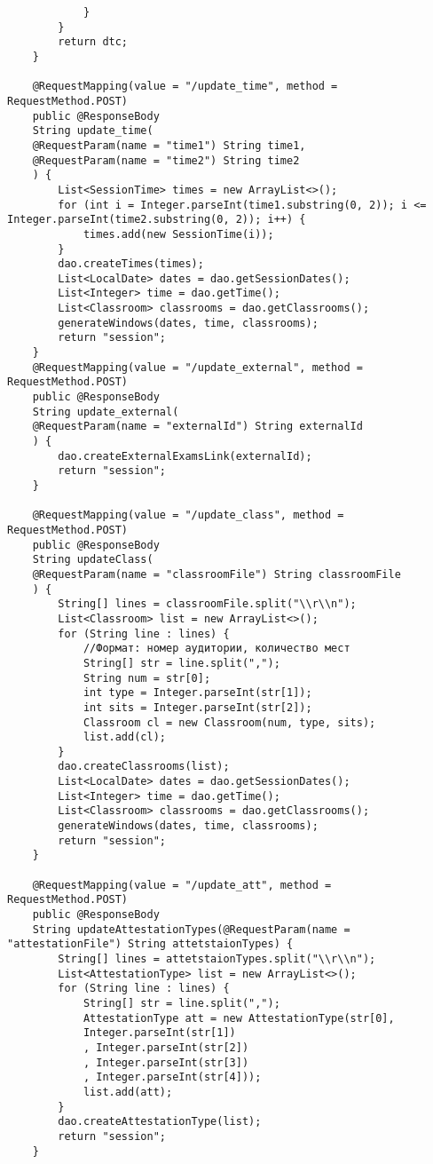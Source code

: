 \begin{lstlisting}
			}
		}
		return dtc;
	}
	
	@RequestMapping(value = "/update_time", method = RequestMethod.POST)
	public @ResponseBody
	String update_time(
	@RequestParam(name = "time1") String time1,
	@RequestParam(name = "time2") String time2
	) {
		List<SessionTime> times = new ArrayList<>();
		for (int i = Integer.parseInt(time1.substring(0, 2)); i <= Integer.parseInt(time2.substring(0, 2)); i++) {
			times.add(new SessionTime(i));
		}
		dao.createTimes(times);
		List<LocalDate> dates = dao.getSessionDates();
		List<Integer> time = dao.getTime();
		List<Classroom> classrooms = dao.getClassrooms();
		generateWindows(dates, time, classrooms);
		return "session";
	}
	@RequestMapping(value = "/update_external", method = RequestMethod.POST)
	public @ResponseBody
	String update_external(
	@RequestParam(name = "externalId") String externalId
	) {
		dao.createExternalExamsLink(externalId);
		return "session";
	}
	
	@RequestMapping(value = "/update_class", method = RequestMethod.POST)
	public @ResponseBody
	String updateClass(
	@RequestParam(name = "classroomFile") String classroomFile
	) {
		String[] lines = classroomFile.split("\\r\\n");
		List<Classroom> list = new ArrayList<>();
		for (String line : lines) {
			//Формат: номер аудитории, количество мест
			String[] str = line.split(",");
			String num = str[0];
			int type = Integer.parseInt(str[1]);
			int sits = Integer.parseInt(str[2]);
			Classroom cl = new Classroom(num, type, sits);
			list.add(cl);
		}
		dao.createClassrooms(list);
		List<LocalDate> dates = dao.getSessionDates();
		List<Integer> time = dao.getTime();
		List<Classroom> classrooms = dao.getClassrooms();
		generateWindows(dates, time, classrooms);
		return "session";
	}
	
	@RequestMapping(value = "/update_att", method = RequestMethod.POST)
	public @ResponseBody
	String updateAttestationTypes(@RequestParam(name = "attestationFile") String attetstaionTypes) {
		String[] lines = attetstaionTypes.split("\\r\\n");
		List<AttestationType> list = new ArrayList<>();
		for (String line : lines) {
			String[] str = line.split(",");
			AttestationType att = new AttestationType(str[0],
			Integer.parseInt(str[1])
			, Integer.parseInt(str[2])
			, Integer.parseInt(str[3])
			, Integer.parseInt(str[4]));
			list.add(att);
		}
		dao.createAttestationType(list);
		return "session";
	}
	

\end{lstlisting}
